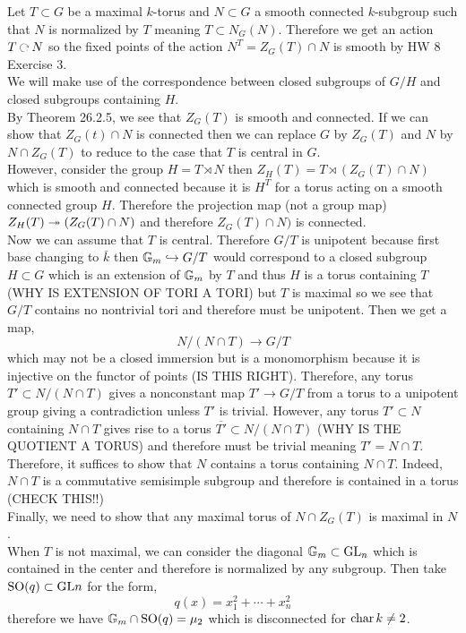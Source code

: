\documentclass[12pt]{article}
\begin{document}
Let $T \subset G$ be a maximal $k$-torus and $N \subset G$ a smooth connected $k$-subgroup such that $N$ is normalized by $T$ meaning $T \subset N_G(N)$. Therefore we get an action $T \acts N$ so the fixed points of the action $N^T = Z_G(T) \cap N$ is smooth by HW 8 Exercise 3. 
\bigskip\\
We will make use of the correspondence between closed subgroups of $G/H$ and closed subgroups containing $H$. 
\bigskip\\
By Theorem 26.2.5, we see that $Z_G(T)$ is smooth and connected. If we can show that $Z_G(t) \cap N$ is connected then we can replace $G$ by $Z_G(T)$ and $N$ by $N \cap Z_G(T)$ to reduce to the case that $T$ is central in $G$.
\bigskip\\
However, consider the group $H = T \rtimes N$ then $Z_H(T) = T \rtimes (Z_G(T) \cap N)$ which is smooth and connected because it is $H^T$ for a torus acting on a smooth connected group $H$. Therefore the projection map (not a group map) $Z_H(T) \twoheadrightarrow (Z_G(T) \cap N)$ and therefore $Z_G(T) \cap N)$ is connected. 
\bigskip\\
Now we can assume that $T$ is central. Therefore $G/T$ is unipotent because first base changing to $\bar{k}$ then ${\mathbb{G}_m} \hookrightarrow G/T$ would correspond to a closed subgroup $H \subset G$ which is an extension of ${\mathbb{G}_m}$ by $T$ and thus $H$ is a torus containing $T$ (WHY IS EXTENSION OF TORI A TORI) but $T$ is maximal so we see that $G/T$ contains no nontrivial tori and therefore must be unipotent. Then we get a map,
\[ N / (N \cap T) \to G / T \]
which may not be a closed immersion but is a monomorphism because it is injective on the functor of points (IS THIS RIGHT). Therefore, any torus $T' \subset N / (N \cap T)$ gives a nonconstant map $T' \to G/T$ from a torus to a unipotent group giving a contradiction unless $T'$ is trivial. However, any torus $T' \subset N$ containing $N \cap T$ gives rise to a torus $\overline{T'} \subset N/(N \cap T)$ (WHY IS THE QUOTIENT A TORUS) and therefore must be trivial meaning $T' = N \cap T$. Therefore, it suffices to show that $N$ contains a torus containing $N \cap T$. Indeed, $N \cap T$ is a commutative semisimple subgroup and therefore is contained in a torus (CHECK THIS!!)
\bigskip\\
Finally, we need to show that any maximal torus of $N \cap Z_G(T)$ is maximal in $N$.
\bigskip\\
When $T$ is not maximal, we can consider the diagonal ${\mathbb{G}_m} \subset \mathrm{GL}_{n}$ which is contained in the center and therefore is normalized by any subgroup. Then take $\mathrm{SO}(q) \subset \mathrm{GL}{n}$ for the form,
\[ q(x) = x_1^2 + \cdots + x_n^2 \]
therefore we have ${\mathbb{G}_m} \cap \mathrm{SO}(q) = \mu_2$ which is disconnected for $\operatorname{\mathrm{char}}{k} \neq 2$. 
\end{document}
